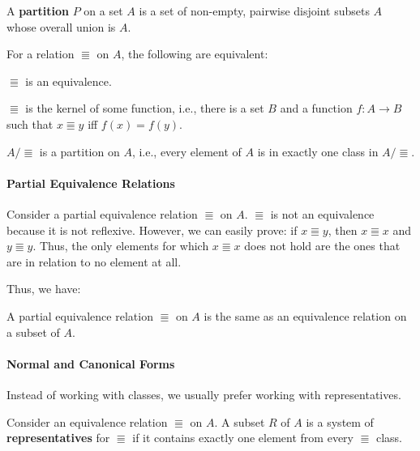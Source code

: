 \begin{definition}[Partition]
A \textbf{partition} $P$ on a set $A$ is a set of non-empty, pairwise disjoint subsets $A$ whose overall union is $A$.
\end{definition}

\begin{theorem}
For a relation $\Equiv$ on $A$, the following are equivalent\footnotemark:
\begin{compactitem}
 \item $\Equiv$ is an equivalence.
 \item $\Equiv$ is the kernel of some function, i.e., there is a set $B$ and a function $f:A\to B$ such that $x\Equiv y$ iff $f(x)=f(y)$.
 \item $A/\Equiv$ is a partition on $A$, i.e., every element of $A$ is in exactly one class in $A/\Equiv$.
\end{compactitem}
\end{theorem}

\paragraph{Partial Equivalence Relations}
Consider a partial equivalence relation $\Equiv$ on $A$.
$\Equiv$ is not an equivalence because it is not reflexive.
However, we can easily prove: if $x \Equiv y$, then $x\Equiv x$ and $y\Equiv y$.
Thus, the only elements for which $x\Equiv x$ does not hold are the ones that are in relation to no element at all.

Thus, we have:
\begin{theorem}\label{thm:math:per}
A partial equivalence relation $\Equiv$ on $A$ is the same as an equivalence relation on a subset of $A$.
\end{theorem}

\paragraph{Normal and Canonical Forms}
Instead of working with classes, we usually prefer working with representatives.

\begin{definition}
Consider an equivalence relation $\Equiv$ on $A$.
A subset $R$ of $A$ is a system of \textbf{representatives} for $\Equiv$ if it contains exactly one element from every $\Equiv$ class.
\end{definition}

